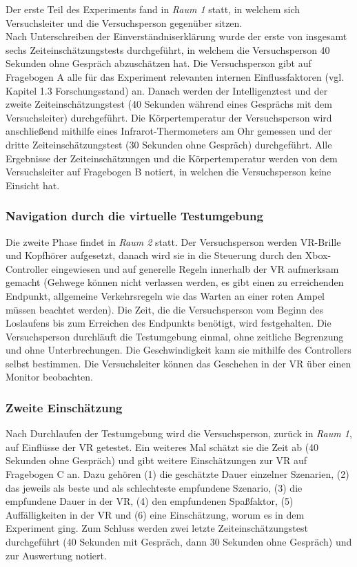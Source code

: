 \documentclass{Paper}
\begin{document}
Der erste Teil des Experiments fand in \textit{Raum 1} statt, in welchem sich Versuchsleiter und die Versuchsperson gegenüber sitzen.\\
Nach Unterschreiben der Einverständniserklärung wurde der erste von insgesamt sechs Zeiteinschätzungstests durchgeführt, in welchem die Versuchsperson 40 Sekunden ohne Gespräch abzuschätzen hat. Die Versuchsperson gibt auf Fragebogen A alle für das Experiment relevanten internen Einflussfaktoren (vgl. Kapitel 1.3  Forschungsstand) an.
Danach werden der Intelligenztest und der zweite Zeiteinschätzungstest (40 Sekunden während eines Gesprächs mit dem Versuchsleiter) durchgeführt. Die Körpertemperatur der Versuchsperson wird anschließend mithilfe eines Infrarot-Thermometers am Ohr gemessen und der dritte Zeiteinschätzungstest (30 Sekunden ohne Gespräch) durchgeführt.
Alle Ergebnisse der Zeiteinschätzungen und die Körpertemperatur werden von dem Versuchsleiter auf Fragebogen B notiert, in welchen die Versuchsperson keine Einsicht hat.

\subsubsection{Navigation durch die virtuelle Testumgebung}
Die zweite Phase findet in \textit{Raum 2} statt. Der Versuchsperson werden VR-Brille und Kopfhörer aufgesetzt, danach wird sie in die Steuerung durch den Xbox-Controller eingewiesen und auf generelle Regeln innerhalb der VR aufmerksam gemacht (Gehwege können nicht verlassen werden, es gibt einen zu erreichenden Endpunkt, allgemeine Verkehrsregeln wie das Warten an einer roten Ampel müssen beachtet werden). 
Die Zeit, die die Versuchsperson vom Beginn des Loslaufens bis zum Erreichen des Endpunkts benötigt, wird festgehalten.
Die Versuchsperson durchläuft die Testumgebung einmal, ohne zeitliche Begrenzung und ohne Unterbrechungen. Die Geschwindigkeit kann sie mithilfe des Controllers selbst bestimmen. Die Versuchsleiter können das Geschehen in der VR über einen Monitor beobachten.

\subsubsection{Zweite Einschätzung}
Nach Durchlaufen der Testumgebung wird die Versuchsperson, zurück in \textit{Raum 1}, auf Einflüsse der VR getestet. Ein weiteres Mal schätzt sie die Zeit ab (40 Sekunden ohne Gespräch) und gibt weitere Einschätzungen zur VR auf Fragebogen C an. Dazu gehören (1) die geschätzte Dauer einzelner Szenarien, (2) das jeweils als beste und als schlechteste empfundene Szenario, (3)  die empfundene Dauer in der VR, (4) den empfundenen Spaßfaktor, (5) Auffälligkeiten in der VR und (6) eine Einschätzung, worum es in dem Experiment ging.
Zum Schluss werden zwei letzte Zeiteinschätzungstest durchgeführt (40 Sekunden mit Gespräch, dann 30 Sekunden ohne Gespräch) und zur Auswertung notiert.
\end{document}

